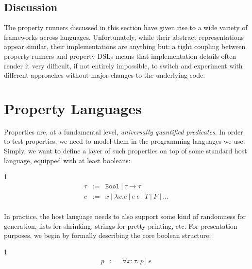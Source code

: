 \subsection{Discussion}

The property runners discussed in this section have given rise to a wide variety of
frameworks across languages. Unfortunately, while their abstract representations appear
similar, their implementations are anything but: a tight coupling between property
runners and property DSLs means that implementation details often render it very
difficult, if not entirely impossible, to switch and experiment with different
approaches without major changes to the underlying code.

\section{Property Languages}\label{sec:property-languages}

\providecommand*{\sprop}{\ensuremath{\mathit{prop}}}
\providecommand*{\sforall}{\ensuremath{\mathit{forall}}}
\providecommand*{\scheck}{\ensuremath{\mathit{check}}}
\providecommand*{\srun}{\ensuremath{\mathit{run}}}
\providecommand*{\tbool}{\ensuremath{\mathtt{Bool}}}
\providecommand*{\trand}{\ensuremath{\mathtt{Rand}}}
\providecommand*{\tfun}[2]{\ensuremath{#1 \rightarrow #2}}
\providecommand*{\denv}[1]{\ensuremath{\left[\!\left[#1\right]\!\right]}}
\providecommand{\HC}[1]{\code[language=Haskell]{#1}}

Properties are, at a fundamental level, \emph{universally quantified predicates}. In
order to test properties, we need to model them in the programming languages we use.
Simply, we want to define a layer of such properties on top of some standard host
language, equipped with at least booleans:

\begin{spacing}{1}
  \[
    \begin{array}{rcl}
      \tau & := & \tbool ~|~ \tfun{\tau}{\tau}                     \\
      e    & := & x ~|~ \lambda x. e ~|~ e ~ e ~|~ T ~|~ F ~|~ ... \\
    \end{array}
  \]
\end{spacing}
\vspace{0.5\baselineskip}

In practice, the host language needs to also support some kind of randomness for
generation, lists for shrinking, strings for pretty printing, etc. For presentation
purposes, we begin by formally describing the core boolean structure:
\begin{spacing}{1}
  \[
    \begin{array}{rcl}
      p & := & \forall x : \tau. ~p ~|~ e \\
    \end{array}
  \]
\end{spacing}
\vspace{0.5\baselineskip}


